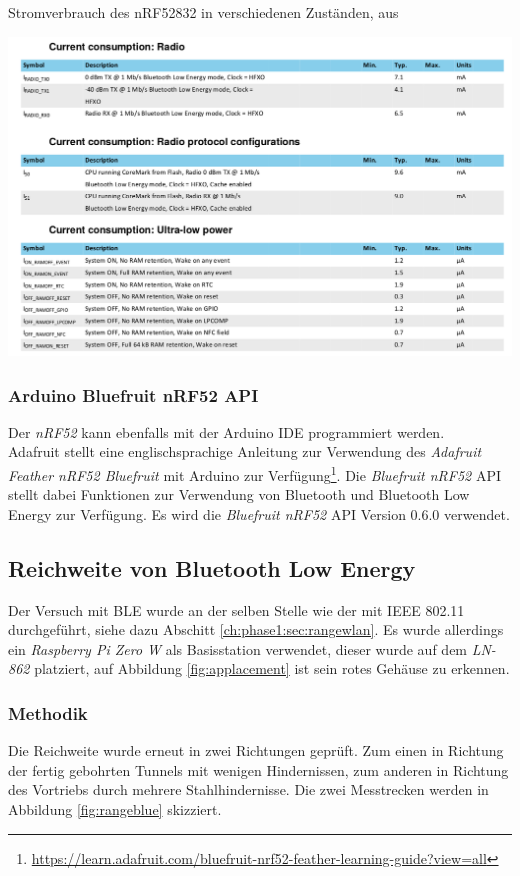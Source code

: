 \begin{table}[h]
  \centering
  \caption{Stromverbrauch des nRF52832 in verschiedenen Zuständen, aus \cite{nordic2017nrf}}
	\includegraphics[width=\textwidth]{images/nrf52consumption.png}
  \label{table:nrf52consumption}
\end{table}


\subsubsection{Arduino Bluefruit nRF52 API}
Der \emph{nRF52} kann ebenfalls mit der Arduino IDE programmiert werden.\\
Adafruit stellt eine englischsprachige Anleitung zur Verwendung des \textit{Adafruit Feather nRF52 Bluefruit} mit Arduino zur Verfügung\footnote{\url{https://learn.adafruit.com/bluefruit-nrf52-feather-learning-guide?view=all}}.
Die \emph{Bluefruit nRF52} API stellt dabei Funktionen zur Verwendung von Bluetooth und Bluetooth Low Energy zur Verfügung.
Es wird die \emph{Bluefruit nRF52} API Version 0.6.0 verwendet.



\subsection{Reichweite von Bluetooth Low Energy}
Der Versuch mit BLE wurde an der selben Stelle wie der mit IEEE 802.11 durchgeführt, siehe dazu Abschitt \ref{ch:phase1:sec:rangewlan}.
Es wurde allerdings ein \emph{Raspberry Pi Zero W} als Basisstation verwendet, dieser wurde auf dem \emph{LN-862} platziert, auf Abbildung \ref{fig:applacement} ist sein rotes Gehäuse zu erkennen.

\subsubsection{Methodik}
Die Reichweite wurde erneut in zwei Richtungen geprüft.
Zum einen in Richtung der fertig gebohrten Tunnels mit wenigen Hindernissen, zum anderen in Richtung des Vortriebs durch mehrere Stahlhindernisse.
Die zwei Messtrecken werden in Abbildung \ref{fig:rangeblue} skizziert.

